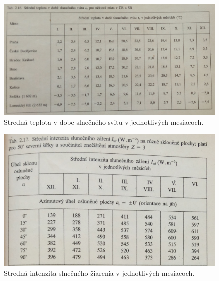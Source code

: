\documentclass[a4paper, 11pt]{article}
\begin{document}
\begin{figure}[H] 
\centering
\includegraphics[width=.7\paperwidth]{images/str50.jpg}
\caption{Stredná teplota v dobe slnečného svitu v jednotlivých mesiacoch.}
\label{str50}
\end{figure}

\begin{figure}[H] 
\centering
\includegraphics[width=.7\paperwidth]{images/str51.jpg}
\caption{Stredná intenzita slnečného žiarenia v jednotlivých mesiacoch.}
\label{str51}
\end{figure}
\end{document}
